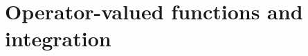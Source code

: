 
\chapter{Operator-valued functions and integration}
\label{ch:operator-valued_functions_and_integration}